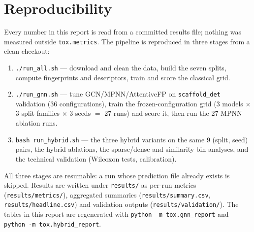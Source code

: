 \documentclass[conference]{IEEEtran}
\newcommand{\code}[1]{\texttt{\small #1}}
\begin{document}
\section{Reproducibility}
\label{app:repro}
Every number in this report is read from a committed results file; nothing was measured outside
\code{tox.metrics}. The pipeline is reproduced in three stages from a clean checkout:

\begin{enumerate}
\item \code{./run\_all.sh} --- download and clean the data, build the seven splits, compute
fingerprints and descriptors, train and score the classical grid.
\item \code{./run\_gnn.sh} --- tune GCN/MPNN/AttentiveFP on \code{scaffold\_det} validation
(36 configurations), train the frozen-configuration grid (3 models $\times$ 3 split families
$\times$ 3 seeds $=$ 27 runs) and score it, then run the 27 MPNN ablation runs.
\item \code{bash run\_hybrid.sh} --- the three hybrid variants on the same 9 (split, seed)
pairs, the hybrid ablations, the sparse/dense and similarity-bin analyses, and the technical
validation (Wilcoxon tests, calibration).
\end{enumerate}

All three stages are resumable: a run whose prediction file already exists is skipped. Results
are written under \code{results/} as per-run metrics (\code{results/metrics/}), aggregated
summaries (\code{results/summary.csv}, \code{results/headline.csv}) and validation outputs
(\code{results/validation/}). The tables in this report are regenerated with
\code{python -m tox.gnn\_report} and \code{python -m tox.hybrid\_report}.
\end{document}
